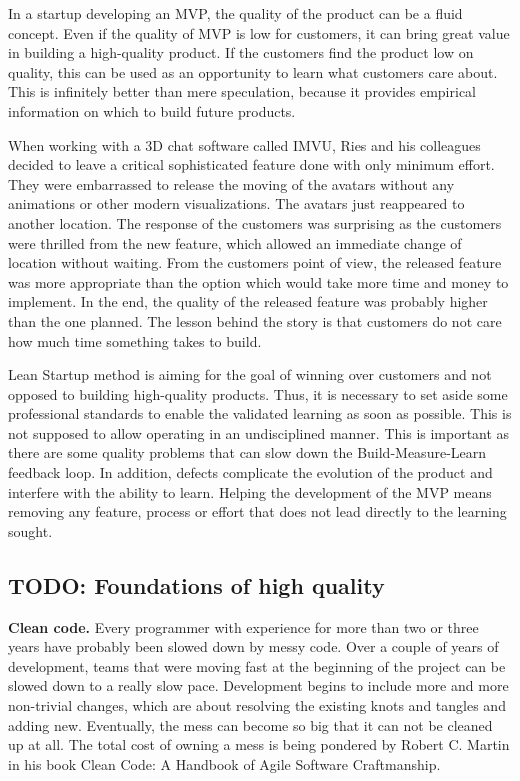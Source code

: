 In a startup developing an MVP, the quality of the product can be a fluid concept. Even if the quality of MVP is low for customers, it can bring great value in building a high-quality product. If the customers find the product low on quality, this can be used as an opportunity to learn what customers care about. This is infinitely better than mere speculation, because it provides empirical information on which to build future products.

When working with a 3D chat software called IMVU, Ries and his colleagues decided to leave a critical sophisticated feature done with only minimum effort. They were embarrassed to release the moving of the avatars without any animations or other modern visualizations. The avatars just reappeared to another location. The response of the customers was surprising as the customers were thrilled from the new feature, which allowed an immediate change of location without waiting. From the customers point of view, the released feature was more appropriate than the option which would take more time and money to implement. In the end, the quality of the released feature was probably higher than the one planned. The lesson behind the story is that customers do not care how much time something takes to build.

Lean Startup method is aiming for the goal of winning over customers and not opposed to building high-quality products. Thus, it is necessary to set aside some professional standards to enable the validated learning as soon as possible. This is not supposed to allow operating in an undisciplined manner. This is important as there are some quality problems that can slow down the Build-Measure-Learn feedback loop. In addition, defects complicate the evolution of the product and interfere with the ability to learn. Helping the development of the MVP means removing any feature, process or effort that does not lead directly to the learning sought.~\cite{ries2011lean}

\subsection{TODO: Foundations of high quality}

 \textbf{Clean code.} Every programmer with experience for more than two or three years have probably been slowed down by messy code. Over a couple of years of development, teams that were moving fast at the beginning of the project can be slowed down to a really slow pace. Development begins to include more and more non-trivial changes, which are about resolving the existing knots and tangles and adding new. Eventually, the mess can become so big that it can not be cleaned up at all. The total cost of owning a mess is being pondered by Robert C. Martin in his book Clean Code: A Handbook of Agile Software Craftmanship.

